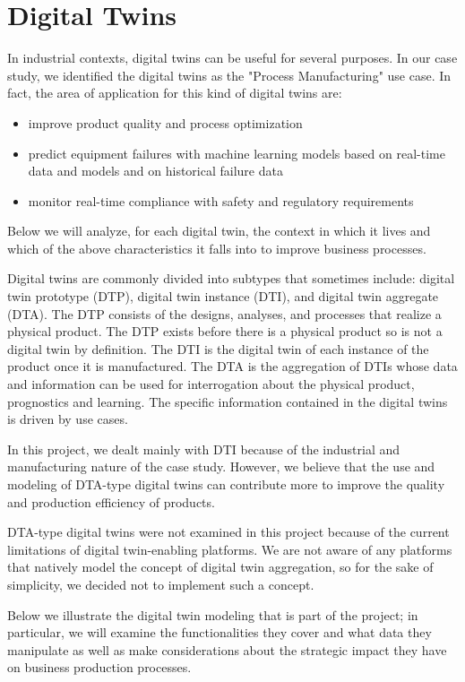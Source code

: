 \chapter{Digital Twins}
In industrial contexts, digital twins can be useful for several purposes.
In our case study, we identified the digital twins as the "Process Manufacturing" use case.
In fact, the area of application for this kind of digital twins are:
\begin{itemize}
	\item improve product quality and process optimization
	\item predict equipment failures with machine learning models based on real-time data and models and on historical failure data
	\item monitor real-time compliance with safety and regulatory requirements
\end{itemize}
Below we will analyze, for each digital twin, the context in which it lives and which of the above characteristics it falls into to improve business processes.

Digital twins are commonly divided into subtypes that sometimes include: digital twin prototype (DTP), digital twin instance (DTI), and digital twin aggregate (DTA).
The DTP consists of the designs, analyses, and processes that realize a physical product.
The DTP exists before there is a physical product so is not a digital twin by definition.
The DTI is the digital twin of each instance of the product once it is manufactured.
The DTA is the aggregation of DTIs whose data and information can be used for interrogation about the physical product, prognostics and learning.
The specific information contained in the digital twins is driven by use cases.

In this project, we dealt mainly with DTI because of the industrial and manufacturing nature of the case study.
However, we believe that the use and modeling of DTA-type digital twins can contribute more to improve the quality and production efficiency of products.

DTA-type digital twins were not examined in this project because of the current limitations of digital twin-enabling platforms.
We are not aware of any platforms that natively model the concept of digital twin aggregation, so for the sake of simplicity, we decided not to implement such a concept.


Below we illustrate the digital twin modeling that is part of the project; in particular, we will examine the functionalities they cover and what data they
manipulate as well as make considerations about the strategic impact they have on business production processes.

